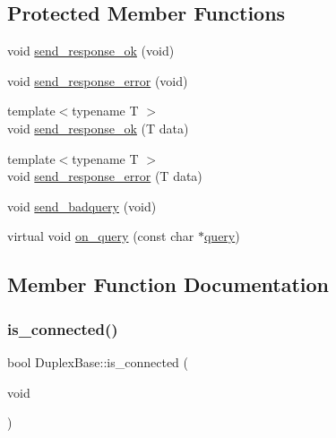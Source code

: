 \subsection*{Protected Member Functions}
\begin{DoxyCompactItemize}
\item 
void \hyperlink{classInterQarpe_1_1DuplexBase_ac4d378add5e8844c8e1de9a48caedc39}{send\+\_\+response\+\_\+ok} (void)
\item 
void \hyperlink{classInterQarpe_1_1DuplexBase_a0dbd283fa8303c429eb1011fd01fcc16}{send\+\_\+response\+\_\+error} (void)
\item 
{\footnotesize template$<$typename T $>$ }\\void \hyperlink{classInterQarpe_1_1DuplexBase_aa7f5efac1989b9a1f9f45eb5f6127d80}{send\+\_\+response\+\_\+ok} (T data)
\item 
{\footnotesize template$<$typename T $>$ }\\void \hyperlink{classInterQarpe_1_1DuplexBase_abc6ffcbbcb8b9b078113f9132151528e}{send\+\_\+response\+\_\+error} (T data)
\item 
void \hyperlink{classInterQarpe_1_1DuplexBase_a730b5db8ac250221b881a99d7ae5b8a0}{send\+\_\+badquery} (void)
\item 
virtual void \hyperlink{classInterQarpe_1_1DuplexBase_a4acc79abc4ff57238ca7efc8eaa30064}{on\+\_\+query} (const char $\ast$\hyperlink{classInterQarpe_1_1DuplexBase_a1b3a0a47a6f8c3d6a50959484d118a51}{query})
\end{DoxyCompactItemize}


\subsection{Member Function Documentation}
\mbox{\label{classInterQarpe_1_1DuplexBase_a734993799429420b6e0554c5afce074a}} 
\subsubsection{\texorpdfstring{is\+\_\+connected()}{is\_connected()}}
{\footnotesize\ttfamily bool Duplex\+Base\+::is\+\_\+connected (\begin{DoxyParamCaption}\item[{void}]{ }\end{DoxyParamCaption})}

